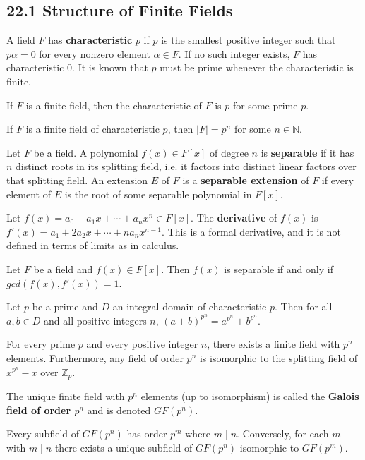 \documentclass{article}
\newcommand{\N}{\mathbb{N}}
\newcommand{\Z}{\mathbb{Z}}
\begin{document}
\subsection{22.1 Structure of Finite Fields}
\begin{definition}
  A field $F$ has \textbf{characteristic} $p$ if $p$ is the smallest positive integer such that $p\alpha=0$ for every nonzero element $\alpha\in F$. If no such integer exists, $F$ has characteristic $0$. It is known that $p$ must be prime whenever the characteristic is finite.
\end{definition}
\begin{theorem}
  If $F$ is a finite field, then the characteristic of $F$ is $p$ for some prime $p$.
\end{theorem}
\begin{theorem}
  If $F$ is a finite field of characteristic $p$, then $|F|=p^n$ for some $n\in\N$.
\end{theorem}
\begin{definition}
  Let $F$ be a field. A polynomial $f(x)\in F[x]$ of degree $n$ is \textbf{separable} if it has $n$ distinct roots in its splitting field, i.e. it factors into distinct linear factors over that splitting field. An extension $E$ of $F$ is a \textbf{separable extension} of $F$ if every element of $E$ is the root of some separable polynomial in $F[x]$.
\end{definition}
\begin{definition}
  Let $f(x)=a_0+a_1x+\cdots+a_nx^n\in F[x]$. The \textbf{derivative} of $f(x)$ is   $f'(x)=a_1+2a_2x+\cdots+na_nx^{n-1}$. This is a formal derivative, and it is not defined in terms of limits as in calculus.
\end{definition}
\begin{theorem}
  Let $F$ be a field and $f(x)\in F[x]$. Then $f(x)$ is separable if and only if $gcd(f(x),f'(x))=1$.
\end{theorem}
\begin{theorem}
  Let $p$ be a prime and $D$ an integral domain of characteristic $p$. Then for all $a,b\in D$ and all positive integers $n$, $(a+b)^{p^n}=a^{p^n}+b^{p^n}$.
\end{theorem}
\begin{theorem}
  For every prime $p$ and every positive integer $n$, there exists a finite field with $p^n$ elements. Furthermore, any field of order $p^n$ is isomorphic to the splitting field of $x^{p^n}-x$ over $\Z_p$.
\end{theorem}
\begin{definition}
  The unique finite field with $p^n$ elements (up to isomorphism) is called the \textbf{Galois field of order $p^n$} and is denoted $GF(p^n)$.
\end{definition}
\begin{theorem}
  Every subfield of $GF(p^n)$ has order $p^m$ where $m\mid n$. Conversely, for each $m$ with $m\mid n$ there exists a unique subfield of $GF(p^n)$ isomorphic to $GF(p^m)$.
\end{theorem}
\end{document}
